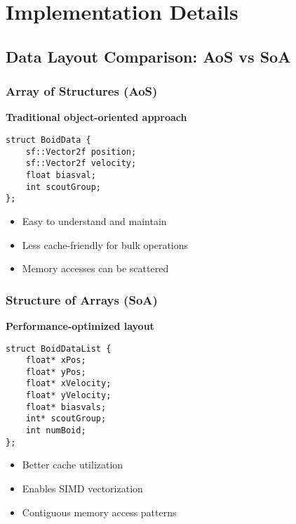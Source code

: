 \chapter{Implementation Details}

\section{Data Layout Comparison: AoS vs SoA}

\subsection{Array of Structures (AoS)}
\textbf{Traditional object-oriented approach}

\begin{center}
\begin{minipage}{0.48\textwidth}
\centering
\begin{lstlisting}[style=cppstyle]
struct BoidData {
    sf::Vector2f position;
    sf::Vector2f velocity;
    float biasval;
    int scoutGroup;
};
\end{lstlisting}
\end{minipage}
\hfill
\begin{minipage}{0.48\textwidth}
\centering
\begin{itemize}
    \item Easy to understand and maintain
    \item Less cache-friendly for bulk operations
    \item Memory accesses can be scattered
\end{itemize}
\end{minipage}
\end{center}

\newpage
\subsection{Structure of Arrays (SoA)}
\textbf{Performance-optimized layout}

\begin{center}
\begin{minipage}{0.48\textwidth}
\centering
\begin{lstlisting}[style=cppstyle]
struct BoidDataList {
    float* xPos;
    float* yPos;
    float* xVelocity;
    float* yVelocity;
    float* biasvals;
    int* scoutGroup;
    int numBoid;
};
\end{lstlisting}
\end{minipage}
\hfill
\begin{minipage}{0.48\textwidth}
\centering
\begin{itemize}
    \item Better cache utilization
    \item Enables SIMD vectorization
    \item Contiguous memory access patterns
\end{itemize}
\end{minipage}
\end{center}


